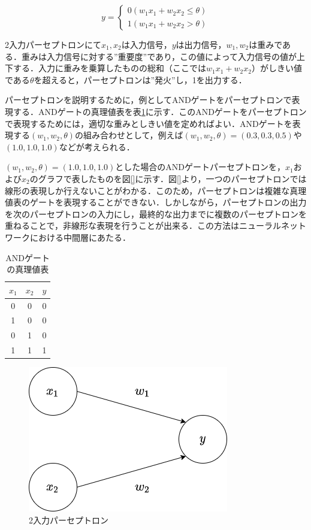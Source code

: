 \documentclass[a4j, 11pt]{jreport}
\begin{document}
\begin{equation}
y= \left \{
\begin{array}{l}
0　(w_1x_1 + w_2x_2 \leq \theta)\\
1　(w_1x_1 + w_2x_2 > \theta)
\end{array}
\right.
\label{eq:pa-septoron}
\end{equation}

2入力パーセプトロンにて$x_1, x_2$は入力信号，$y$は出力信号，$w_1, w_2$は重みである．重みは入力信号に対する''重要度''であり，この値によって入力信号の値が上下する．入力に重みを乗算したものの総和（ここでは$w_1x_1 + w_2x_2$）がしきい値である$\theta$を超えると，パーセプトロンは''発火''し，1を出力する．

パーセプトロンを説明するために，例としてANDゲートをパーセプトロンで表現する．ANDゲートの真理値表を表\ref{tb:and_gate}に示す．このANDゲートをパーセプトロンで表現するためには，適切な重みとしきい値を定めればよい．ANDゲートを表現する$(w_1, w_2, \theta)$の組み合わせとして，例えば$(w_1, w_2, \theta) = (0.3, 0.3, 0.5)$や$(1.0, 1.0, 1.0)$などが考えられる．

$(w_1, w_2, \theta) = (1.0, 1.0, 1.0)$とした場合のANDゲートパーセプトロンを，$x_1$および$x_2$のグラフで表したものを図\ref{}に示す．図\ref{}より，一つのパーセプトロンでは線形の表現しか行えないことがわかる．このため，パーセプトロンは複雑な真理値表のゲートを表現することができない．しかしながら，パーセプトロンの出力を次のパーセプトロンの入力にし，最終的な出力までに複数のパーセプトロンを重ねることで，非線形な表現を行うことが出来る．この方法はニューラルネットワークにおける中間層にあたる．

\begin{table}[htbp]
  \centering
	\caption{ANDゲートの真理値表}
  \begin{tabular}{cc|c}
    $x_1$ & $x_2$ & $y$ \\ \hline
    0 & 0 & 0 \\ 
    1 & 0 & 0 \\
    0 & 1 & 0 \\
    1 & 1 & 1 \\
  \end{tabular}
  \label{tb:and_gate}
\end{table}



\begin{figure}
 \centering
 \includegraphics[width=0.50\hsize, keepaspectratio]{images/drawio/pa-seputoron.png}
 \caption{2入力パーセプトロン}
 \label{fig:pa-septoron}
\end{figure}
\end{document}
